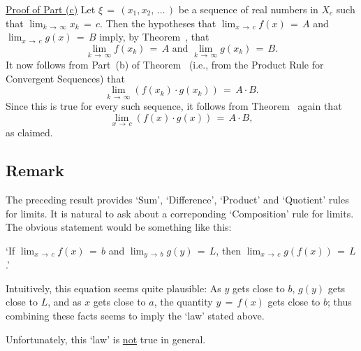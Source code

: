 {        \underline{Proof of Part (c)} Let ${\xi} \,=\, (x_{1},x_{2},\,{\ldots}\,)$ be a sequence of real numbers in $X_{c}$ such that $\lim_{k \,{\rightarrow}\, {\infty}} x_{k} \,=\, c$.
    Then the hypotheses that ${\displaystyle \lim_{x \,{\rightarrow}\, c} f(x) \,=\, A}$ and ${\displaystyle \lim_{x \,{\rightarrow}\, c} g(x) \,=\, B}$ imply, 
    by Theorem~, that
        \begin{displaymath}
        \lim_{k \,{\rightarrow}\, {\infty}} f(x_{k}) \,=\, A \mbox{ and }
        \lim_{k \,{\rightarrow}\, {\infty}} g(x_{k}) \,=\, B.
        \end{displaymath}
    It now follows from Part~(b) of Theorem~ (i.e., from the Product Rule for Convergent Sequences) that
        \begin{displaymath}
        \lim_{k \,{\rightarrow}\, {\infty}} (f(x_{k}){\cdot}g(x_{k})) \,=\, A{\cdot}B.
        \end{displaymath}
    Since this is true for every such sequence, it follows from Theorem~ again that
        \begin{displaymath}
        \lim_{x \,{\rightarrow}\, c} (f(x){\cdot}g(x)) \,=\, A{\cdot}B,
        \end{displaymath}
    as claimed.

\V

            \subsection{\small{\bf Remark}}
            \label{RemrkC90.80}

        The preceding result provides `Sum', `Difference', `Product' and `Quotient' rules for limits.
    It is natural to ask about a correponding `Composition' rule for limits.
    The obvious statement would be something like this:

        `If ${\displaystyle \lim_{x \,{\rightarrow}\, c}} f(x) \,=\, b$ and ${\displaystyle \lim_{y \,{\rightarrow}\, b} g(y) \,=\, L}$, then
    ${\displaystyle \lim_{x \,{\rightarrow}\, c} g(f(x)) \,=\, L}$.'

\noindent Intuitively, this equation seems quite plausible:  As $y$ gets close to $b$, $g(y)$ gets close to $L$,
    and as $x$ gets close to $a$, the quantity $y \,=\, f(x)$ gets close to $b$;
    thus combining these facts seems to imply the `law' stated above.

    Unfortunately, this `law' is \underline{not} true in general.

}
